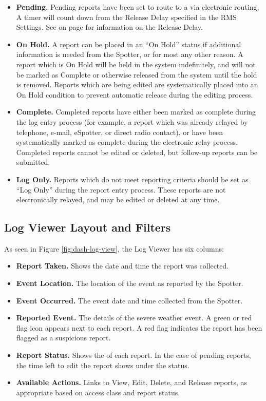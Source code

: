 \documentclass[pdflatex,letterpaper,twoside,12pt]{book}
\begin{document}
\begin{itemize}
\item \textbf{Pending.}  Pending reports have been set to route to a  via electronic routing.  A timer will count down from the Release Delay specified in the RMS Settings.  See  on page \pageref{dash-rms-settings} for information on the Release Delay.
\item \textbf{On Hold.}  A report can be placed in an ``On Hold'' status if additional information is needed from the Spotter, or for most any other reason.  A report which is On Hold will be held in the system indefinitely, and will not be marked as Complete or otherwise released from the system until the hold is removed.  Reports which are being edited are systematically placed into an On Hold condition to prevent automatic release during the editing process.
\item \textbf{Complete.}  Completed reports have either been marked as complete during the log entry process (for example, a report which was already relayed by telephone, e-mail, eSpotter, or direct radio contact), or have been systematically marked as complete during the electronic relay process.  Completed reports cannot be edited or deleted, but follow-up reports can be submitted.
\item \textbf{Log Only.}  Reports which do not meet reporting criteria should be set as ``Log Only'' during the report entry process.  These reports are not electronically relayed, and may be edited or deleted at any time.
\end{itemize}

\subsection{Log Viewer Layout and Filters}\label{log-layout-filters}

As seen in Figure \ref{fig:dash-log-view}, the Log Viewer has six columns:

\begin{itemize}
\item \textbf{Report Taken.}  Shows the date and time the report was collected.
\item \textbf{Event Location.}  The location of the event as reported by the Spotter.
\item \textbf{Event Occurred.}  The event date and time collected from the Spotter.
\item \textbf{Reported Event.}  The details of the severe weather event.  A green or red flag icon appears next to each report.  A red flag indicates the report has been flagged as a suspicious report.
\item \textbf{Report Status.}  Shows the  of each report.  In the case of pending reports, the time left to edit the report shows under the status.
\item \textbf{Available Actions.}  Links to View, Edit, Delete, and Release reports, as appropriate based on access class and report status.
\end{itemize}
\end{document}
